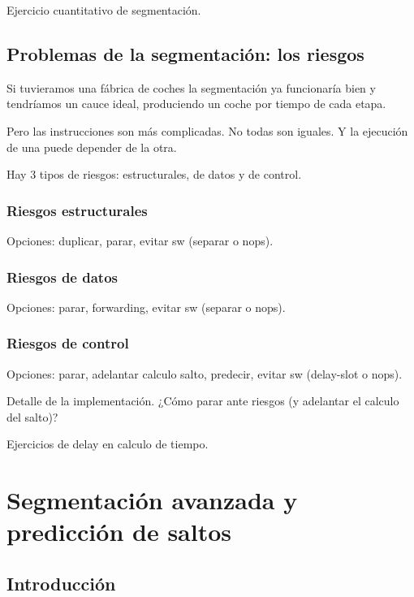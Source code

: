 \documentclass[12pt,onecolumn]{memoir}
\begin{document}
Ejercicio cuantitativo de segmentación.

\section{Problemas de la segmentación: los riesgos}

Si tuvieramos una fábrica de coches la segmentación ya funcionaría
bien y tendríamos un cauce ideal, produciendo un coche por tiempo de
cada etapa.

Pero las instrucciones son más complicadas. No todas son iguales. Y la
ejecución de una puede depender de la otra.

Hay 3 tipos de riesgos: estructurales, de datos y de control. 

\subsection{Riesgos estructurales}

Opciones: duplicar, parar, evitar sw (separar o nops).

\subsection{Riesgos de datos}

Opciones: parar, forwarding, evitar sw (separar o nops).

\subsection{Riesgos de control}

Opciones: parar, adelantar calculo salto, predecir, evitar sw (delay-slot o nops).

Detalle de la implementación. ¿Cómo parar ante riesgos (y adelantar el
calculo del salto)?

Ejercicios de delay en calculo de tiempo.


\chapter{Segmentación avanzada y predicción de saltos}
\label{cap:avanzada}


\section{Introducción}
\label{sec:introduccion_avanzada}
\end{document}
